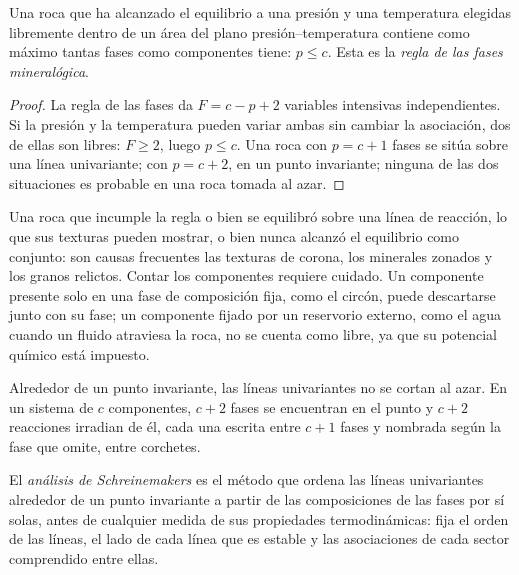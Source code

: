 \begin{proposition}\label{prop:b3:petrological-thermodynamics:goldschmidt}
Una roca que ha alcanzado el equilibrio a una presión y una temperatura elegidas
libremente dentro de un área del plano presión--temperatura contiene como máximo tantas
fases como componentes tiene: $p \le c$. Esta es la
\emph{regla de las fases mineralógica}.
\end{proposition}

\begin{proof}
La regla de las fases da $F = c - p + 2$ variables intensivas independientes. Si la
presión y la temperatura pueden variar ambas sin cambiar la asociación, dos
de ellas son libres: $F \ge 2$, luego $p \le c$. Una roca con $p = c + 1$ fases se sitúa
sobre una línea univariante; con $p = c + 2$, en un punto invariante; ninguna de las dos
situaciones es probable en una roca tomada al azar.
\end{proof}

Una roca que incumple la regla o bien se equilibró sobre una línea de reacción, lo que sus
texturas pueden mostrar, o bien nunca alcanzó el equilibrio como conjunto: son causas
frecuentes las texturas de corona, los minerales zonados y los granos relictos. Contar los
componentes requiere cuidado. Un componente presente solo en una fase de composición fija, como
el circón, puede descartarse junto con su fase; un componente fijado por un reservorio externo,
como el agua cuando un fluido atraviesa la roca, no se cuenta como libre, ya que su potencial
químico está impuesto.

Alrededor de un punto invariante, las líneas univariantes no se cortan al azar. En un
sistema de $c$ componentes, $c + 2$ fases se encuentran en el punto y $c + 2$
reacciones irradian de él, cada una escrita entre $c + 1$ fases y nombrada según la
fase que omite, entre corchetes.

\begin{definition}\label{def:b3:petrological-thermodynamics:schreinemakers}
El \emph{análisis de Schreinemakers} es el método
que ordena las líneas univariantes alrededor de un punto invariante a partir de las
composiciones de las fases por sí solas, antes de cualquier medida de sus
propiedades termodinámicas: fija el orden de las líneas, el lado de cada
línea que es estable y las asociaciones de cada sector comprendido entre ellas.
\end{definition}

